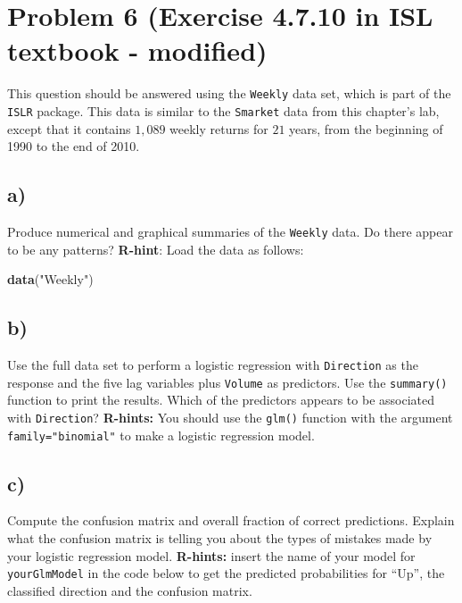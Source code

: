\documentclass[
]{article}
\newenvironment{Shaded}{\begin{snugshade}}{\end{snugshade}}
\newcommand{\FunctionTok}[1]{\textcolor[rgb]{0.13,0.29,0.53}{\textbf{#1}}}
\newcommand{\NormalTok}[1]{#1}
\newcommand{\StringTok}[1]{\textcolor[rgb]{0.31,0.60,0.02}{#1}}
\begin{document}
\section{Problem 6 (Exercise 4.7.10 in ISL textbook -
modified)}\label{problem-6-exercise-4.7.10-in-isl-textbook---modified}

This question should be answered using the \texttt{Weekly} data set,
which is part of the \texttt{ISLR} package. This data is similar to the
\texttt{Smarket} data from this chapter's lab, except that it contains
\(1,089\) weekly returns for \(21\) years, from the beginning of 1990 to
the end of 2010.

\subsection{a)}\label{a-5}

Produce numerical and graphical summaries of the \texttt{Weekly} data.
Do there appear to be any patterns? \textbf{R-hint}: Load the data as
follows:

\begin{Shaded}
\begin{Highlighting}[]
\FunctionTok{data}\NormalTok{(}\StringTok{"Weekly"}\NormalTok{)}
\end{Highlighting}
\end{Shaded}

\subsection{b)}\label{b-5}

Use the full data set to perform a logistic regression with
\texttt{Direction} as the response and the five lag variables plus
\texttt{Volume} as predictors. Use the \texttt{summary()} function to
print the results. Which of the predictors appears to be associated with
\texttt{Direction}? \textbf{R-hints:} You should use the \texttt{glm()}
function with the argument \texttt{family="binomial"} to make a logistic
regression model.

\subsection{c)}\label{c-3}

Compute the confusion matrix and overall fraction of correct
predictions. Explain what the confusion matrix is telling you about the
types of mistakes made by your logistic regression model.
\textbf{R-hints:} insert the name of your model for
\texttt{yourGlmModel} in the code below to get the predicted
probabilities for ``Up'', the classified direction and the confusion
matrix.
\end{document}
